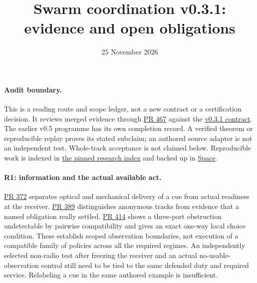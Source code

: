 \documentclass[11pt]{article}
\title{Swarm coordination v0.3.1: evidence and open obligations}
\date{25 November 2026}
\newcommand{\pr}[1]{\href{https://github.com/eternal-november/eos-research-programmes/pull/#1}{PR #1}}
\begin{document}
\maketitle

\paragraph{Audit boundary.}
This is a reading route and scope ledger, not a new contract or a certification decision. It reviews merged evidence through \pr{467} against the \href{https://github.com/eternal-november/eos-research-programmes/blob/8300069d616c03b5cf3a769e69ac165264af320f/projects/swarm-coordination/contracts/Swarm_Fault_Tolerance_Research_Contract_v0_3_1.tex}{v0.3.1 contract}. The earlier v0.5 programme has its own completion record. A verified theorem or reproducible replay proves its stated subclaim; an authored source adapter is not an independent test. Whole-track acceptance is not claimed below. Reproducible work is indexed in \href{https://github.com/eternal-november/eos-research-programmes/blob/e463d45130d9d2cdf406c6f49752892e2939edfd/projects/swarm-coordination/research/README.md}{the pinned research index} and backed up in \href{https://chatgpt.com/space/page_f5a09a52f6b881919b10d91ecf2caa80}{Space}.

\paragraph{R1: information and the actual available act.}
\pr{372} separates optical and mechanical delivery of a cue from actual readiness at the receiver. \pr{389} distinguishes anonymous tracks from evidence that a named obligation really settled. \pr{414} shows a three-port obstruction undetectable by pairwise compatibility and gives an exact one-way local choice condition. These establish scoped observation boundaries, not execution of a compatible family of policies across all the required regimes. An independently selected non-radio test after freezing the receiver and an actual no-usable-observation control still need to be tied to the same defended duty and required service. Relabeling a cue in the same authored example is insufficient.
\end{document}
